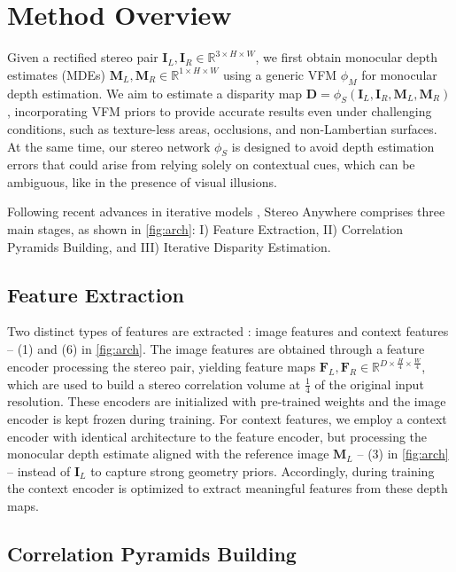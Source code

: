 \documentclass[10pt,twocolumn,letterpaper]{article}
\newcommand{\method}[0]{Stereo Anywhere\xspace}
\begin{document}
\section{Method Overview}
\label{sec:method}

Given a rectified stereo pair $\mathbf{I}_L, \mathbf{I}_R \in \mathbb{R}^{3 \times H \times W}$, we first obtain monocular depth estimates (MDEs) $\mathbf{M}_L, \mathbf{M}_R \in \mathbb{R}^{1 \times H \times W}$ using a generic VFM $\phi_M$ for monocular depth estimation. We aim to estimate a disparity map $\mathbf{D}=\phi_S(\mathbf{I}_L, \mathbf{I}_R, \mathbf{M}_L, \mathbf{M}_R)$, incorporating VFM priors to provide accurate results even under challenging conditions, such as texture-less areas, occlusions, and non-Lambertian surfaces.
At the same time, our stereo network $\phi_S$ is designed to avoid depth estimation errors that could arise from relying solely on contextual cues, which can be ambiguous, like in the presence of visual illusions.

Following recent advances in iterative models \cite{lipson2021raft}, \method comprises three main stages, as shown in \cref{fig:arch}: I) Feature Extraction, II) Correlation Pyramids Building, and III) Iterative Disparity Estimation.

\subsection{Feature Extraction}

Two distinct types of features are extracted \cite{lipson2021raft}: image features and context features -- (1) and (6) in \cref{fig:arch}.
The image features are obtained through a feature encoder processing the stereo pair, yielding feature maps $\mathbf{F}_L, \mathbf{F}_R \in \mathbb{R}^{D \times \frac{H}{4} \times \frac{W}{4}}$, which are used to build a stereo correlation volume at $\frac{1}{4}$ of the original input resolution.
These encoders are initialized with pre-trained weights \cite{lipson2021raft} and the image encoder is kept frozen during training.
For context features, we employ a context encoder with identical architecture to the feature encoder, but processing the monocular depth estimate aligned with the reference image $\mathbf{M}_L$ -- (3) in \cref{fig:arch} -- instead of $\mathbf{I}_L$ to capture strong geometry priors. Accordingly, during training the context encoder is optimized to extract meaningful features from these depth maps.

\subsection{Correlation Pyramids Building}
\label{subsec:corr_pyramids}
\end{document}
